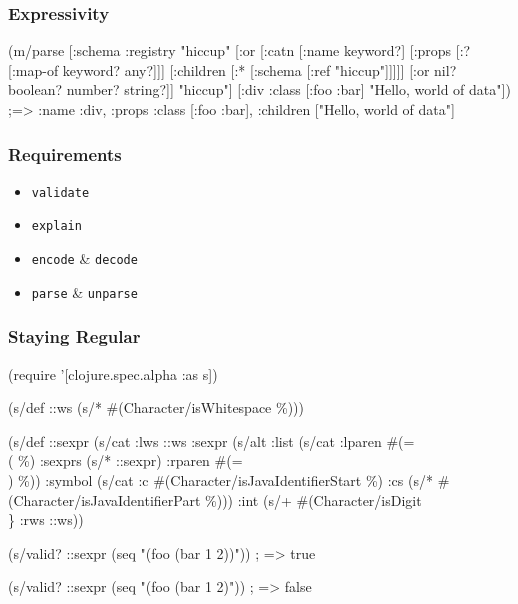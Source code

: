 \documentclass{beamer}
\begin{document}
\begin{frame}[fragile]
\frametitle{Expressivity}

{\scriptsize
\begin{semiverbatim}
(m/parse
  [:schema {:registry {"hiccup" [:or
                                 [:catn
                                  [:name keyword?]
                                  [:props [:? [:map-of keyword? any?]]]
                                  [:children [:* [:schema [:ref "hiccup"]]]]]
                                 [:or nil? boolean? number? string?]]}}
   "hiccup"]
  [:div {:class [:foo :bar]}
   "Hello, world of data"])
;=> {:name :div, :props {:class [:foo :bar]}, :children ["Hello, world of data"]}
\end{semiverbatim}
}

\end{frame}


\begin{frame}
\frametitle{Requirements}

\begin{itemize}
\item \texttt{validate}
\item \texttt{explain}
\item \texttt{encode} \& \texttt{decode}
\item \texttt{parse} \& \texttt{unparse}
\end{itemize}
\end{frame}


\begin{frame}[fragile]
\frametitle{Staying Regular}

{\scriptsize
\begin{semiverbatim}
(require '[clojure.spec.alpha :as s])

(s/def ::ws (s/* \#(Character/isWhitespace \%)))

(s/def ::sexpr
  (s/cat
    :lws ::ws
    :sexpr (s/alt
             :list (s/cat :lparen \#(= \\( \%)
                          :sexprs (s/* ::sexpr)
                          :rparen #(= \\) \%))
             :symbol (s/cat :c #(Character/isJavaIdentifierStart \%)
                            :cs (s/* #(Character/isJavaIdentifierPart \%)))
             :int (s/+ \#(Character/isDigit \\\}%
    :rws ::ws))

(s/valid? ::sexpr (seq "(foo (bar 1 2))"))
; => true

(s/valid? ::sexpr (seq "(foo (bar 1 2)"))
; => false
\end{semiverbatim}
}

\end{frame}
\end{document}
